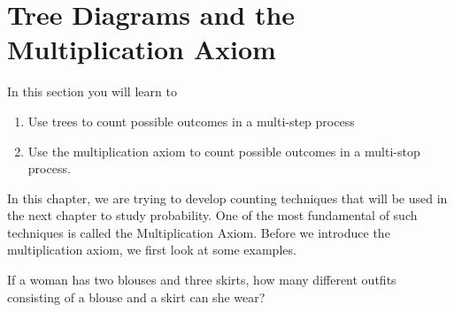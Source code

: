 \section{Tree Diagrams and the Multiplication Axiom}\label{section_tree_diagrams}

In this section you will learn to
\begin{enumerate}
    \item Use trees to count possible outcomes in a multi-step process
    \item Use the multiplication axiom to count possible outcomes in a multi-stop process.
\end{enumerate}

In this chapter, we are trying to develop counting techniques that will be used in the next chapter to study probability.  One of the most fundamental of such techniques is called the Multiplication Axiom.  Before we introduce the multiplication axiom, we first look at some examples.

\begin{example}
    If a woman has two blouses and three skirts, how many different outfits consisting of a blouse and a skirt can she wear?
\end{example}

